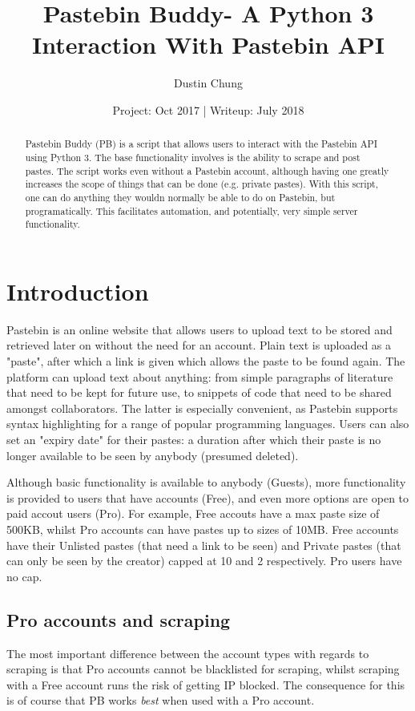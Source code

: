\documentclass[11pt, a4paper]{article}
\begin{document}
  \title{Pastebin Buddy- A Python 3 Interaction With Pastebin API}
  \author{Dustin Chung}
  \date{Project: Oct 2017 | Writeup: July 2018}
  \maketitle
  \begin{abstract}
    Pastebin Buddy (PB) is a script that allows users to interact with the Pastebin API using Python 3. The base functionality involves is the ability to scrape and post pastes. The script works even without a Pastebin account, although having one greatly increases the scope of things that can be done (e.g. private pastes). With this script, one can do anything they wouldn normally be able to do on Pastebin, but programatically. This facilitates automation, and potentially, very simple server functionality.
  \end{abstract}

  \section{Introduction}
    Pastebin is an online website that allows users to upload text to be stored and retrieved later on without the need for an account. Plain text is uploaded as a "paste", after which a link is given which allows the paste to be found again. The platform can upload text about anything: from simple paragraphs of literature that need to be kept for future use, to snippets of code that need to be shared amongst collaborators. The latter is especially convenient, as Pastebin supports syntax highlighting for a range of popular programming languages. Users can also set an "expiry date" for their pastes: a duration after which their paste is no longer available to be seen by anybody (presumed deleted).

    Although basic functionality is available to anybody (Guests), more functionality is provided to users that have accounts (Free), and even more options are open to paid accout users (Pro). For example, Free accouts have a max paste size of 500KB, whilst Pro accounts can have pastes up to sizes of 10MB. Free accounts have their Unlisted pastes (that need a link to be seen) and Private pastes (that can only be seen by the creator) capped at 10 and 2 respectively. Pro users have no cap.

    \subsection{Pro accounts and scraping}
      The most important difference between the account types with regards to scraping is that Pro accounts cannot be blacklisted for scraping, whilst scraping with a Free account runs the risk of getting IP blocked. The consequence for this is of course that PB works \textit{best} when used with a Pro account.
\end{document}
